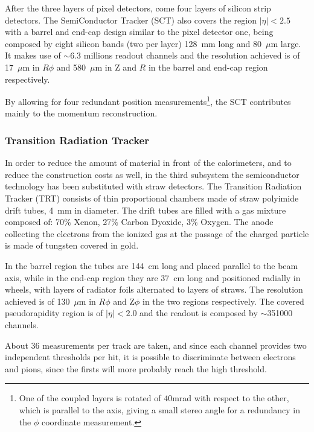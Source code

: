 After the three layers of pixel detectors, come four layers of  silicon strip detectors. The SemiConductor
Tracker (SCT) also covers the region $|\eta|<2.5$ with a barrel and end-cap design similar to the 
pixel detector one, being composed by eight silicon bands (two per layer) 128~mm long and 80~$\mu$m large.
It makes use of $\sim$6.3 millions readout channels and the resolution achieved is of 17~$\mu$m 
in $R\phi$  and 580~$\mu$m in Z and $R$ in the barrel and end-cap region respectively.

By allowing for four redundant position measurements\footnote{One of the coupled layers is rotated of $40$mrad with respect
to the other, which is parallel to the axis, giving a small stereo angle for a redundancy in the $\phi$ coordinate measurement.}, 
the SCT contributes mainly to the momentum reconstruction.


\subsubsection{Transition Radiation Tracker}

In order to reduce the amount of material in front of the calorimeters, and to reduce the construction costs as well,
in the third subsystem the semiconductor technology has been substituted with straw detectors.
The Transition Radiation Tracker (TRT) consists of thin proportional chambers made of straw polyimide drift tubes, 4~mm in diameter.
The drift tubes are filled with a gas mixture composed of: 70\% Xenon, 27\% Carbon Dyoxide, 3\% Oxygen. The anode 
collecting the electrons from the ionized gas at the passage of the charged particle is made of
tungsten covered in gold.

In the barrel region the tubes are 144~cm long and placed parallel to the beam axis, while in the 
end-cap region they are 37~cm long and positioned radially in wheels, with layers of radiator foils alternated 
to layers of straws. The resolution achieved is of 130~$\mu$m in $R\phi$ and Z$\phi$  in the two regions respectively.
The covered pseudorapidity region is of $|\eta|<2.0$ and the readout is composed by $\sim$351000 channels.

About 36 measurements per track are taken, and since each channel provides two independent thresholds per hit,
it is possible to discriminate between electrons and pions, since the firsts will more probably reach the
high threshold.

